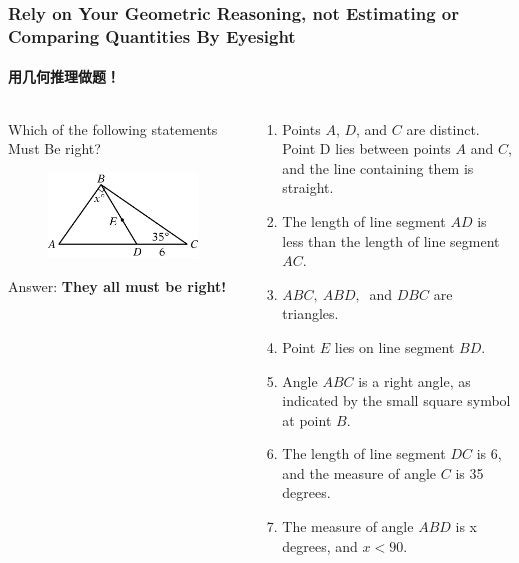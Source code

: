 \documentclass[
	11pt, %
]{beamer}
\begin{document}

\begin{frame}
	\frametitle{Rely on Your Geometric Reasoning, not Estimating or Comparing Quantities By Eyesight} %
	\framesubtitle{用几何推理做题！}
	\begin{columns}[t] 
		\begin{column}{0.4\textwidth} %
		Which of the following statements \alert{Must Be} right?
			\begin{figure}
				\includegraphics[width=\linewidth]{Not_Scale.jpg}
			\end{figure}
				Answer: \textbf{\alert{They all must be right!}}
		\end{column}

	\begin{column}{0.6\textwidth} %
	\begin{enumerate}
		\item Points $A$, $D$, and $C$ are distinct. Point D lies between points $A$ and $C$, and the line containing them is straight.
		\item The length of line segment $AD$ is less than the length of line segment $AC$.
		\item $ABC,\ ABD,\ $ and $DBC$ are triangles.
		\item Point $E$ lies on line segment $BD$.
		\item Angle $ABC$ is a right angle, as indicated by the small square symbol at point $B$.
		\item The length of line segment $DC$ is 6, and the measure of angle $C$ is 35 degrees.
		\item The measure of angle $ABD$ is x degrees, and $x<90$.
	\end{enumerate}
	\end{column}
	\end{columns}
\end{frame}
\end{document}
